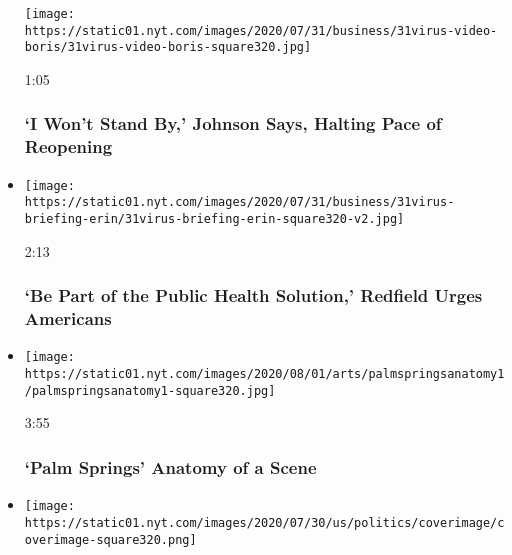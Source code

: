 \begin{itemize}
  \texttt{[image: https://static01.nyt.com/images/2020/07/31/business/31virus-video-boris/31virus-video-boris-square320.jpg]}

  1:05

  \hypertarget{i-wont-stand-by-johnson-says-halting-pace-of-reopening}{%
  \subsubsection{`I Won't Stand By,' Johnson Says, Halting Pace of
  Reopening}\label{i-wont-stand-by-johnson-says-halting-pace-of-reopening}}
\item
  \href{https://www.nytimes.com/video/us/politics/100000007266691/fauci-congress-testimony.html?action=click\&module=video-series-bar\&region=header\&pgtype=Article\&playlistId=video/latest-video}{}

  \texttt{[image: https://static01.nyt.com/images/2020/07/31/business/31virus-briefing-erin/31virus-briefing-erin-square320-v2.jpg]}

  2:13

  \hypertarget{be-part-of-the-public-health-solution-redfield-urges-americans}{%
  \subsubsection{`Be Part of the Public Health Solution,' Redfield Urges
  Americans}\label{be-part-of-the-public-health-solution-redfield-urges-americans}}
\item
  \href{https://www.nytimes.com/video/movies/100000007265338/palm-springs-scene.html?action=click\&module=video-series-bar\&region=header\&pgtype=Article\&playlistId=video/latest-video}{}

  \texttt{[image: https://static01.nyt.com/images/2020/08/01/arts/palmspringsanatomy1/palmspringsanatomy1-square320.jpg]}

  3:55

  \hypertarget{palm-springs--anatomy-of-a-scene}{%
  \subsubsection{`Palm Springs' \textbar{} Anatomy of a
  Scene}\label{palm-springs--anatomy-of-a-scene}}
\item
  \href{https://www.nytimes.com/video/us/politics/100000007265038/trump-inhofe-audio-call.html?action=click\&module=video-series-bar\&region=header\&pgtype=Article\&playlistId=video/latest-video}{}

  \texttt{[image: https://static01.nyt.com/images/2020/07/30/us/politics/coverimage/coverimage-square320.png]}


\end{itemize}
